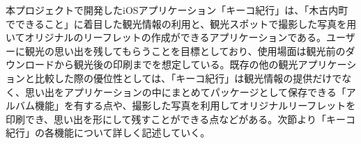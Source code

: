 本プロジェクトで開発したiOSアプリケーション「キーコ紀行」は、「木古内町でできること」に着目した観光情報の利用と、観光スポットで撮影した写真を用いてオリジナルのリーフレットの作成ができるアプリケーションである。ユーザーに観光の思い出を残してもらうことを目標としており、使用場面は観光前のダウンロードから観光後の印刷までを想定している。既存の他の観光アプリケーションと比較した際の優位性としては、「キーコ紀行」は観光情報の提供だけでなく、思い出をアプリケーションの中にまとめてパッケージとして保存できる「アルバム機能」を有する点や、撮影した写真を利用してオリジナルリーフレットを印刷でき、思い出を形にして残すことができる点などがある。次節より「キーコ紀行」の各機能について詳しく記述していく。

